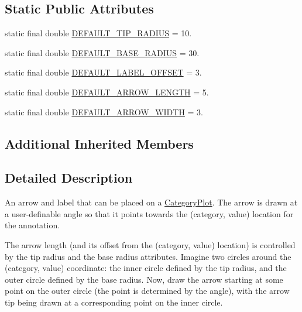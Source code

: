 \subsection*{Static Public Attributes}
\begin{DoxyCompactItemize}
\item 
static final double \mbox{\hyperlink{classorg_1_1jfree_1_1chart_1_1annotations_1_1_category_pointer_annotation_ad4b5d2f236bf35015c35d6c626901928}{D\+E\+F\+A\+U\+L\+T\+\_\+\+T\+I\+P\+\_\+\+R\+A\+D\+I\+US}} = 10.
\item 
static final double \mbox{\hyperlink{classorg_1_1jfree_1_1chart_1_1annotations_1_1_category_pointer_annotation_ada3c8ced03e3558444640a18da492d88}{D\+E\+F\+A\+U\+L\+T\+\_\+\+B\+A\+S\+E\+\_\+\+R\+A\+D\+I\+US}} = 30.
\item 
static final double \mbox{\hyperlink{classorg_1_1jfree_1_1chart_1_1annotations_1_1_category_pointer_annotation_a9e6be113eba0b63fe8e78cb38e6f0215}{D\+E\+F\+A\+U\+L\+T\+\_\+\+L\+A\+B\+E\+L\+\_\+\+O\+F\+F\+S\+ET}} = 3.
\item 
static final double \mbox{\hyperlink{classorg_1_1jfree_1_1chart_1_1annotations_1_1_category_pointer_annotation_abf7cf3025827a83a6e16f1d60cc940a1}{D\+E\+F\+A\+U\+L\+T\+\_\+\+A\+R\+R\+O\+W\+\_\+\+L\+E\+N\+G\+TH}} = 5.
\item 
static final double \mbox{\hyperlink{classorg_1_1jfree_1_1chart_1_1annotations_1_1_category_pointer_annotation_a63c8ff1567ab130ac37ba25f39d95421}{D\+E\+F\+A\+U\+L\+T\+\_\+\+A\+R\+R\+O\+W\+\_\+\+W\+I\+D\+TH}} = 3.
\end{DoxyCompactItemize}
\subsection*{Additional Inherited Members}


\subsection{Detailed Description}
An arrow and label that can be placed on a \mbox{\hyperlink{}{Category\+Plot}}. The arrow is drawn at a user-\/definable angle so that it points towards the (category, value) location for the annotation. 

The arrow length (and its offset from the (category, value) location) is controlled by the tip radius and the base radius attributes. Imagine two circles around the (category, value) coordinate\+: the inner circle defined by the tip radius, and the outer circle defined by the base radius. Now, draw the arrow starting at some point on the outer circle (the point is determined by the angle), with the arrow tip being drawn at a corresponding point on the inner circle.


